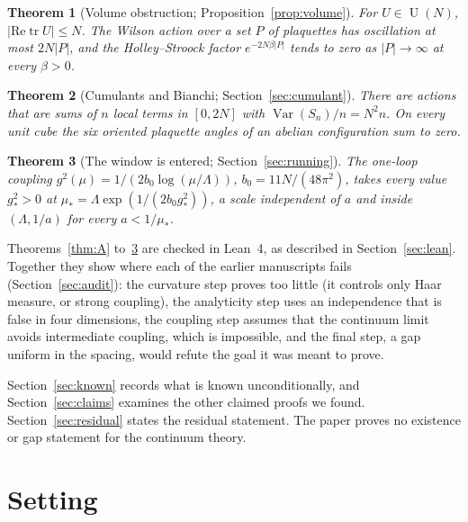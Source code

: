 \documentclass[aps,prd,twocolumn,superscriptaddress,nofootinbib,floatfix]{revtex4-2}
\newtheorem{theorem}{Theorem}
\theoremstyle{definition}
\theoremstyle{remark}
\DeclareMathOperator{\U}{U}
\DeclareMathOperator{\Tr}{tr}
\DeclareMathOperator{\Var}{Var}
\begin{document}
\begin{theorem}[Volume obstruction; Proposition~\ref{prop:volume}]
\label{thm:B}
For $U\in\U(N)$, $|\mathrm{Re}\Tr U|\le N$. The Wilson action over a set
$P$ of plaquettes has oscillation at most $2N|P|$, and the Holley--Stroock
factor $e^{-2N\beta|P|}$ tends to zero as $|P|\to\infty$ at every
$\beta>0$.
\end{theorem}

\begin{theorem}[Cumulants and Bianchi; Section~\ref{sec:cumulant}]
\label{thm:C}
There are actions that are sums of $n$ local terms in $[0,2N]$ with
$\Var(S_n)/n=N^2n$. On every unit cube the six oriented plaquette angles of
an abelian configuration sum to zero.
\end{theorem}

\begin{theorem}[The window is entered; Section~\ref{sec:running}]
\label{thm:D}
The one-loop coupling $g^2(\mu)=1/(2b_0\log(\mu/\Lambda))$,
$b_0=11N/(48\pi^2)$, takes every value $g_*^2>0$ at
$\mu_*=\Lambda\exp(1/(2b_0g_*^2))$, a scale independent of $a$ and inside
$(\Lambda,1/a)$ for every $a<1/\mu_*$.
\end{theorem}

Theorems~\ref{thm:A} to~\ref{thm:D} are checked in Lean~4, as described in
Section~\ref{sec:lean}. Together they show where each of the earlier
manuscripts fails (Section~\ref{sec:audit}): the curvature step proves too
little (it controls only Haar measure, or strong coupling), the analyticity
step uses an independence that is false in four dimensions, the coupling
step assumes that the continuum limit avoids intermediate coupling, which is
impossible, and the final step, a gap uniform in the spacing, would refute
the goal it was meant to prove.

Section~\ref{sec:known} records what is known unconditionally, and
Section~\ref{sec:claims} examines the other claimed proofs we found.
Section~\ref{sec:residual} states the residual statement. The paper proves
no existence or gap statement for the continuum theory.

\section{Setting}
\label{sec:setting}
\end{document}
